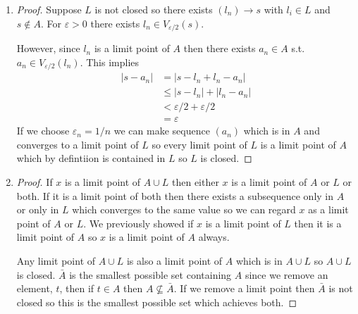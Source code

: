 \begin{enumerate}[label=(\alph*)]
    \item 
    \begin{proof}
        Suppose $L$ is not closed so there exists 
        $(l_n) \rightarrow s$ with $l_i \in L$ and $s\not\in A$.
        For $\varepsilon>0$ there exists $l_n \in V_{\varepsilon/2}(s)$.

        However, since $l_n$ is a limit point of $A$ then there exists 
        $a_n \in  A$ s.t. $a_n \in V_{\varepsilon/2}(l_n)$.
        This implies
        \begin{align}
            |s-a_n| &= |s-l_n+l_n-a_n| \\
                    &\leq |s-l_n|+|l_n-a_n| \\
                    &< \varepsilon/2 + \varepsilon/2 \\
                    &=\varepsilon
        \end{align}
        If we choose $\varepsilon_n = 1/n$ we can make sequence
         $(a_n)$ which is in $A$ and converges to a limit point of 
         $L$ so every limit point of $L$ is a limit point of $A$ 
         which by defintiion is contained in $L$ so $L$ is closed.
    \end{proof}

    \item
    \begin{proof}
        If $x$ is a limit point of $A\cup L$ then either $x$ is a
        limit point of $A$ or $L$ or both. If it is a limit point of 
        both then there exists a subsequence only in $A$ or only in $L$
        which converges to the same value so we can regard $x$ as a limit point
        of $A$ or $L$. We previously showed if $x$ is a limit point of $L$
        then it is a limit point of $A$ so $x$ is a limit point of $A$ always.
        
        Any limit point of $A\cup L$ is also 
        a limit point of $A$ which is in $A\cup L$ so $A\cup L$ is closed. 
        $\bar A$ is the smallest possible set containing $A$ since we remove an element, $t$,  
        then if $t \in A$ then $A\nsubseteq \bar A$. If we remove a limit point then $\bar A$
        is not closed so this is the smallest possible set which achieves both.
    \end{proof}
\end{enumerate}

